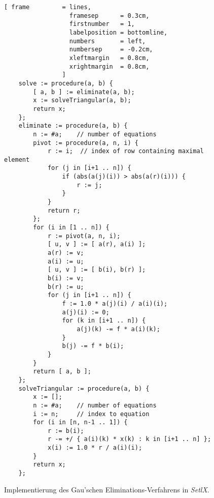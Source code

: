 \begin{figure}[!ht]
\centering
\begin{Verbatim}[ frame         = lines, 
                  framesep      = 0.3cm, 
                  firstnumber   = 1,
                  labelposition = bottomline,
                  numbers       = left,
                  numbersep     = -0.2cm,
                  xleftmargin   = 0.8cm,
                  xrightmargin  = 0.8cm,
                ]
    solve := procedure(a, b) {
        [ a, b ] := eliminate(a, b);
        x := solveTriangular(a, b);
        return x;
    };
    eliminate := procedure(a, b) {
        n := #a;    // number of equations
        pivot := procedure(a, n, i) {
            r := i;  // index of row containing maximal element
            for (j in [i+1 .. n]) {
                if (abs(a(j)(i)) > abs(a(r)(i))) {
                    r := j;
                }
            }
            return r;
        };
        for (i in [1 .. n]) {
            r := pivot(a, n, i);
            [ u, v ] := [ a(r), a(i) ];   
            a(r) := v;
            a(i) := u;
            [ u, v ] := [ b(i), b(r) ];
            b(i) := v;
            b(r) := u;
            for (j in [i+1 .. n]) {
                f := 1.0 * a(j)(i) / a(i)(i);
                a(j)(i) := 0;
                for (k in [i+1 .. n]) {
                    a(j)(k) -= f * a(i)(k);
                }
                b(j) -= f * b(i);
            }    
        }
        return [ a, b ];
    };
    solveTriangular := procedure(a, b) {
        x := [];
        n := #a;    // number of equations
        i := n;     // index to equation
        for (i in [n, n-1 .. 1]) {
            r := b(i);
            r -= +/ { a(i)(k) * x(k) : k in [i+1 .. n] };
            x(i) := 1.0 * r / a(i)(i);
        }
        return x;
    };
\end{Verbatim}
\vspace*{-0.3cm}
\caption{Implementierung des Gau\3'schen Eliminations-Verfahrens in \textsl{SetlX}.}
\label{fig:gauss.stlx}
\end{figure}


